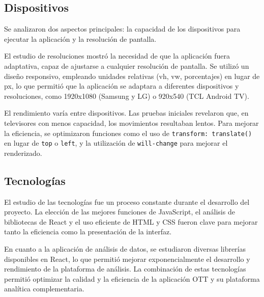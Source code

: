 \subsection{Dispositivos}
\label{subsec:analisis_estudio_dispositivos}

Se analizaron dos aspectos principales: la capacidad de los dispositivos para ejecutar la aplicación y la resolución de pantalla.

El estudio de resoluciones mostró la necesidad de que la aplicación fuera adaptativa, capaz de ajustarse a cualquier resolución de 
pantalla. Se utilizó un diseño responsivo, empleando unidades relativas (vh, vw, porcentajes) en lugar de px, lo que permitió que la 
aplicación se adaptara a diferentes dispositivos y resoluciones, como 1920x1080 (Samsung y LG) o 920x540 (TCL Android TV).

El rendimiento varía entre dispositivos. Las pruebas iniciales revelaron que, en televisores con menos capacidad, los movimientos 
resultaban lentos. Para mejorar la eficiencia, se optimizaron funciones como el uso de \texttt{transform: translate()} en lugar de 
\texttt{top} o \texttt{left}, y la utilización de \texttt{will-change} para mejorar el renderizado.

\subsection{Tecnologías}
\label{subsec:analisis_estudio_tecnologias}

El estudio de las tecnologías fue un proceso constante durante el desarrollo del proyecto. La elección de las mejores funciones de 
JavaScript, el análisis de bibliotecas de React y el uso eficiente de HTML y CSS fueron clave para mejorar tanto la eficiencia 
como la presentación de la interfaz.

En cuanto a la aplicación de análisis de datos, se estudiaron diversas librerías disponibles en React, lo que permitió mejorar 
exponencialmente el desarrollo y rendimiento de la plataforma de análisis. La combinación de estas tecnologías permitió optimizar 
la calidad y la eficiencia de la aplicación OTT y su plataforma analítica complementaria.
